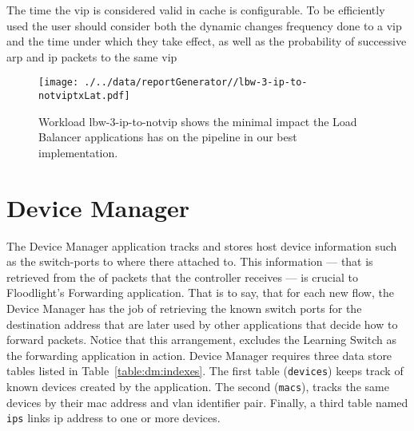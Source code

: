 The time the \gls{vip} is considered valid in cache is
configurable. To be efficiently used the user should consider both the
dynamic changes frequency done to a \gls{vip} and the time under which
they take effect, as well as the probability of successive arp and ip
packets to the same \gls{vip}


\begin{figure}[ht]
\centering
\texttt{[image: ./../data/reportGenerator//lbw-3-ip-to-notviptxLat.pdf]}
\caption[Minimum impact of Load Balancer in the pipeline.]{Workload
  lbw-3-ip-to-notvip shows the minimal impact the Load Balancer
  applications has on the pipeline in our best implementation.}
\end{figure}

\section{Device Manager}
\label{sec:feasibility:dm}
\glsresetall

The Device Manager application tracks and stores host device information such as the switch-ports to where there attached to. 
This information --- that is retrieved from the \gls{of} packets that the controller receives --- is crucial to Floodlight’s Forwarding application. That is to say, that for each new flow, the Device Manager has the job of retrieving the known switch ports for the destination address that are later used by other applications that decide how to forward packets. 
Notice that this arrangement, excludes the Learning Switch as the  forwarding application in action.
Device Manager requires three data store tables listed in Table~\ref{table:dm:indexes}.
The first table (\texttt{devices}) keeps track of known devices created by the application.
The second (\texttt{macs}),  tracks the same devices by their \gls{mac} address and \gls{vlan} identifier pair.
Finally, a third table named \texttt{ips} links  \gls{ip} address to one or more devices.


